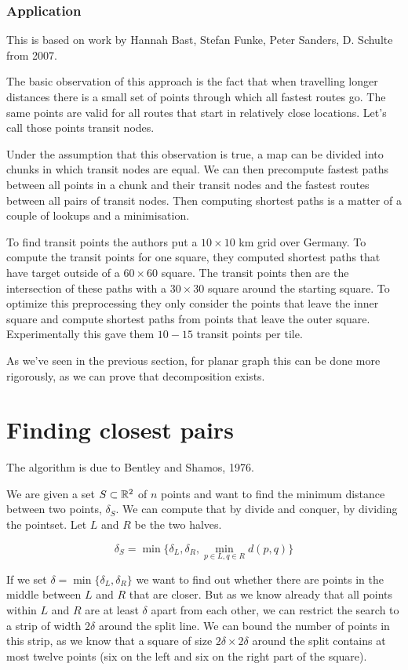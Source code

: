 \subsubsection{Application}

This is based on work by Hannah Bast, Stefan Funke, Peter Sanders, D. Schulte from 2007.

The basic observation of this approach is the fact that when travelling longer distances there is a small set of points through which all fastest routes go. The same points are valid for all routes that start in relatively close locations. Let's call those points transit nodes.

Under the assumption that this observation is true, a map can be divided into chunks in which transit nodes are equal. We can then precompute fastest paths between all points in a chunk and their transit nodes and the fastest routes between all pairs of transit nodes. Then computing shortest paths is a matter of a couple of lookups and a minimisation.

To find transit points the authors put a $10\times 10$ km grid over Germany. To compute the transit points for one square, they computed shortest paths that have target outside of a $60\times 60$ square. The transit points then are the intersection of these paths with a $30\times 30$ square around the starting square. To optimize this preprocessing they only consider the points that leave the inner square and compute shortest paths from points that leave the outer square. Experimentally this gave them $10-15$ transit points per tile.

As we've seen in the previous section, for planar graph this can be done more rigorously, as we can prove that decomposition exists.

\section{Finding closest pairs}

The algorithm is due to Bentley and Shamos, 1976.

We are given a set $S\subset \mathbb{R}^2$ of $n$ points and want to find the minimum distance between two points, $\delta_S$. We can compute that by divide and conquer, by dividing the pointset. Let $L$ and $R$ be the two halves.

\[\delta_S = \min \{\delta_L, \delta_R, \min_{p\in L, q\in R} d(p,q)\}\]

If we set $\delta = \min \{\delta_L, \delta_R\}$ we want to find out whether there are points in the middle between $L$ and $R$ that are closer. But as we know already that all points within $L$ and $R$ are at least $\delta$ apart from each other, we can restrict the search to a strip of width $2\delta$ around the split line. We can bound the number of points in this strip, as we know that a square of size $2\delta \times 2\delta$ around the split contains at most twelve points (six on the left and six on the right part of the square). 

